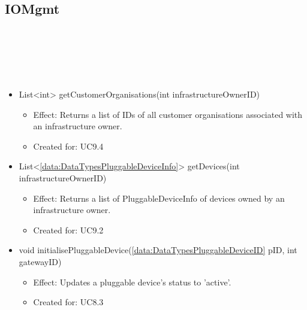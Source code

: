   \subsection{IOMgmt}\label{int:OnlineServiceOnlineServiceInfrastructureOwnerManagerIOMgmt}
    \begin{description}
      \item[Provided by:] \iconcomponent{}~
      \item[Required by:] \iconcomponent{}~
      \item[Operations:] ~
    \begin{itemize}[noitemsep,nolistsep,leftmargin=-.25cm]
      \item \textsf{List\textless{}int\textgreater{} getCustomerOrganisations(int infrastructureOwnerID)}
        \begin{itemize}[noitemsep,nolistsep]
           \item Effect: Returns a list of IDs of all customer organisations associated with an infrastructure owner.
\item Created for: UC9.4
        \end{itemize}
      \item \textsf{List\textless{}\ref{data:DataTypesPluggableDeviceInfo}\textgreater{} getDevices(int infrastructureOwnerID)}
        \begin{itemize}[noitemsep,nolistsep]
           \item Effect: Returns a list of PluggableDeviceInfo of devices owned by an infrastructure owner.
\item Created for: UC9.2
        \end{itemize}
      \item \textsf{void initialisePluggableDevice(\ref{data:DataTypesPluggableDeviceID} pID, int gatewayID)}
        \begin{itemize}[noitemsep,nolistsep]
           \item Effect: Updates a pluggable device's status to 'active'.
\item Created for: UC8.3
        \end{itemize}
    \end{itemize}
    \end{description}

